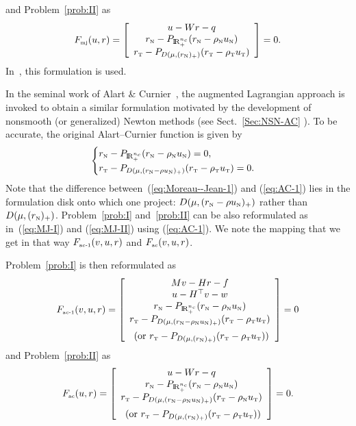 and  Problem~\ref{prob:II}  as
\begin{equation}
  \label{eq:MJ-II}
    F_{\mjtwo}(u,r) = \left[ \begin{array}{c}
    u - W r -  q  \\
    r_\n - P_{\RR^{n_c}_+}(r_\n - \rho_\n u_\n) \\
    r_\t - P_{D(\mu, (r_{\n})_+)}(r_\t - \rho_\t u_\t   ) 
  \end{array}\right] =0.
\end{equation}
 In~\cite{Christensen.Klarbring.ea1998}, this formulation is used.

 In the seminal work of  Alart \& Curnier~\cite{Curnier.Alart88,Alart.Curnier1991}, the augmented Lagrangian approach is invoked to obtain a  similar formulation motivated by the development of nonsmooth (or generalized) Newton methods (see Sect.~\ref{Sec:NSN-AC} ). To be accurate, the original Alart--Curnier function is given by 
\begin{equation}
  \label{eq:AC-1}
  \begin{cases}
    r_\n - P_{\RR^{n_c}_+}(r_\n - \rho_\n  u_\n) = 0, \\
    r_\t - P_{D(\mu, (r_\n - \rho u_\n)_+)}(r_\t - \rho_\t u_\t   )=0.
  \end{cases}
\end{equation}
Note that the difference between~(\ref{eq:Moreau--Jean-1}) and (\ref{eq:AC-1}) lies in the formulation disk onto which one project: $D(\mu, (r_{\hbox{\tiny{N}}} - \rho u_{\hbox{\tiny{N}}})_+)$ rather than $D(\mu, (r_{{\hbox{\tiny{N}}}})_+)$. Problem~\ref{prob:I} and~\ref{prob:II} can be also reformulated as in~(\ref{eq:MJ-I}) and (\ref{eq:MJ-II}) using (\ref{eq:AC-1}). We note the mapping that we get in that way $F_{{\hbox{\tiny{ac-1}}}}(v,u,r)$ and  $F_{{\hbox{\tiny{ac}}}}(v,u,r)$.




Problem~\ref{prob:I} is then reformulated as
\begin{equation}
  \label{eq:AC-I}
  F_{\acone}(v,u,r) = \left[
    \begin{array}{c}
    Mv - Hr - f \\
    u -  H^\top v - w \\
    r_\n - P_{\RR^{n_c}_+}(r_\n - \rho_\n u_\n) \\
    r_\t - P_{D(\mu, (r_\n - \rho_\n u_\n)_+)}(r_\t - \rho_\t u_\t   )\\[2mm] \text{ (or  } r_\t - P_{D(\mu, (r_{\n})_+)}(r_\t - \rho_\t u_\t   ) \text{)}
  \end{array}\right] =0
\end{equation}
and  Problem~\ref{prob:II}  as
\begin{equation}
  \label{eq:AC-II}
    F_{\actwo}(u,r) = \left[ \begin{array}{c}
    u - W r -  q  \\
    r_\n - P_{\RR^{n_c}_+}(r_\n - \rho_\n u_\n) \\
    r_\t - P_{D(\mu, (r_\n - \rho_\n u_\n)_+)}(r_\t - \rho_\n u_\t   )\\[2mm]\text{ (or  } r_\t - P_{D(\mu, (r_{\n})_+)}(r_\t - \rho_\t u_\t   ) \text{)}
  \end{array}\right] =0.
\end{equation}

